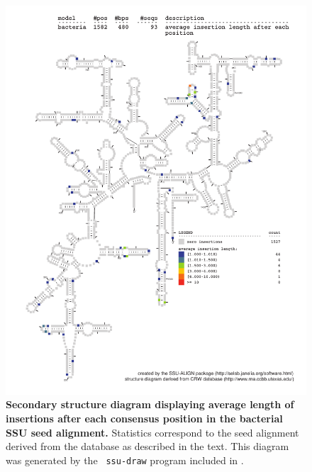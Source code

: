 \begin{figure}
\begin{center}
\includegraphics[width=5.7in]{Figures/bacteria-0p1-iavglen}
\end{center}
\caption[Secondary structure diagram displaying average length of insertions
  after each consensus position in the bacterial SSU seed
  alignment]{\textbf{Secondary structure diagram displaying average
    length of insertions after each consensus position in the bacterial SSU seed
  alignment.} Statistics correspond to the  seed
  alignment derived from the  database \cite{CannoneGutell02}
  as described in the text. This diagram was generated by the {\tt
  ssu-draw} program included in .}
\label{fig:baciavglen}
\end{figure}


